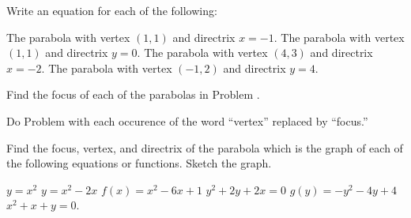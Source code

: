 \begin{exercises}
Write an equation for each of the following:
\begin{exenum}
\sx
The parabola with vertex $(1,1)$ and directrix $x=-1$.
\sx
The parabola with vertex $(1,1)$ and directrix $y=0$.
\sx
The parabola with vertex $(4,3)$ and directrix $x=-2$.
\sx
The parabola with vertex $(-1,2)$ and directrix $y=4$.
\end{exenum}

Find the focus of each of the parabolas in Problem .

Do Problem  with each occurence of the word
``vertex'' replaced by ``focus.''

Find the focus, vertex, and directrix of the parabola which
is the graph of each of the following equations or functions.
Sketch the graph.
\begin{exenum}
\sx
$y = x^2$
\sx
$y = x^2 - 2x$
\sx
$f(x) = x^2 - 6x + 1$
\sx
$y^2 + 2y + 2x = 0$
\sx
$g(y) = -y^2 - 4y + 4$
\sx
$x^2 + x + y = 0$.
\end{exenum}

\end{exercises}
